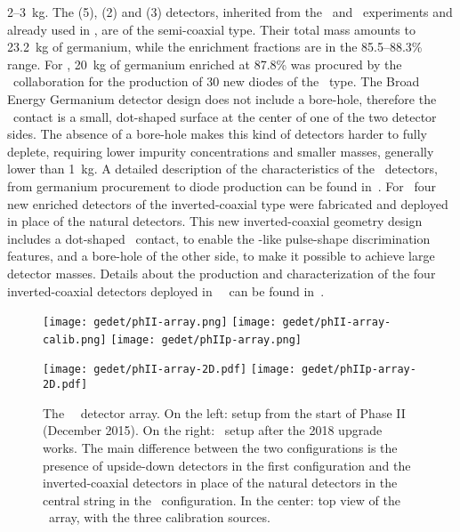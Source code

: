 2--3~kg. The \ANG{} (5), \RG{} (2) and \GTF{} (3) detectors, inherited from the \hdm\ and
\igex\ experiments and already used in \phaseone, are of the semi-coaxial type. Their
total mass amounts to 23.2~kg of germanium, while the enrichment fractions are in the
85.5--88.3\% range. For \phasetwo, 20~kg of germanium enriched at 87.8\% was procured by
the \gerda\ collaboration for the production of 30 new diodes of the \bege\ type. The
Broad Energy Germanium detector design does not include a bore-hole, therefore the \pplus\
contact is a small, dot-shaped surface at the center of one of the two detector sides. The
absence of a bore-hole makes this kind of detectors harder to fully deplete, requiring
lower impurity concentrations and smaller masses, generally lower than 1~kg. A detailed
description of the characteristics of the \bege\ detectors, from germanium procurement to
diode production can be found in~\cite{Agostini2015e, Agostini2018a, Agostini2019}. For
\phasetwop\ four new enriched \IC{} detectors of the inverted-coaxial type were fabricated
and deployed in place of the natural \GTF{} detectors. This new inverted-coaxial geometry
design includes a dot-shaped \pplus\ contact, to enable the \bege-like pulse-shape
discrimination features, and a bore-hole of the other side, to make it possible to achieve
large detector masses. Details about the production and characterization of the  four
inverted-coaxial detectors deployed in \gerda\ \phasetwop\ can be found
in~\cite{inverted-paper}.

\begin{figure}
  \centering
  \texttt{[image: gedet/phII-array.png]}%
  \hspace{0.5cm}%
  \texttt{[image: gedet/phII-array-calib.png]}%
  \hspace{0.5cm}%
  \texttt{[image: gedet/phIIp-array.png]}
  \vspace{1cm}

  \texttt{[image: gedet/phII-array-2D.pdf]}%
  \hspace{0.04\textwidth}%
  \texttt{[image: gedet/phIIp-array-2D.pdf]}
  \caption{%
    The \gerda\ \phasetwo\ detector array. On the left: setup from the start of Phase II
    (December 2015). On the right: \phasetwop\ setup after the 2018 upgrade works. The
    main difference between the two configurations is the presence of upside-down detectors
    in the first configuration and the inverted-coaxial detectors in place of the natural
    detectors in the central string in the \phasetwop\ configuration. In the center: top
    view of the \phasetwo\ array, with the three calibration sources. \fillme{different
    colors for detector types}
  }\label{fig:setup:array}
\end{figure}

